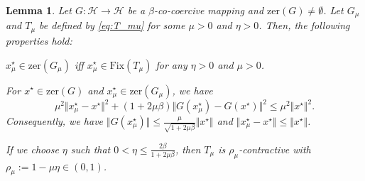 \documentclass{article}
\theoremstyle{plain}
\newtheorem{lemma}{Lemma}[section]
\theoremstyle{definition}
\newcommand{\Hil}{\mathcal{H}}
\newcommand{\norms}[1]{\Vert#1\Vert}
\newcommand{\zer}[1]{\mathrm{zer}(#1)}
\newcommand{\0}{\boldsymbol{0}}
\begin{document}
\begin{lemma}\label{le:regularized_mapping}
Let $G : \Hil \to \Hil$ be a $\beta$-co-coercive mapping and $\zer{G} \neq \emptyset$.
Let $G_{\mu}$ and $T_{\mu}$ be defined by \eqref{eq:T_mu} for some $\mu > 0$ and $\eta > 0$.
Then, the following properties hold:
\begin{compactitem}
\item[$\mathrm{(i)}$] $x^{\star}_{\mu} \in \zer{G_{\mu}}$ iff $x^{\star}_{\mu} \in \mathrm{Fix}(T_{\mu})$ for any $\eta > 0$ and $\mu > 0$.
\item[$\mathrm{(ii)}$] For $x^{\star} \in \zer{G}$ and $x^{\star}_{\mu} \in \zer{G_{\mu}}$, we have 
\begin{equation}\label{eq:G_mu_pro1}
\mu^2\norms{x^{\star}_{\mu} - x^{\star}}^2 + (1 + 2\mu\beta)\norms{G(x^{\star}_{\mu}) - G(x^{\star})}^2 \leq \mu^2\norms{x^{\star}}^2.
\end{equation}
Consequently, we have $\norms{G(x_{\mu}^{\star})} \leq \frac{\mu}{\sqrt{1+2\mu\beta}}\norms{x^{\star}}$ and $\norms{x^{\star}_{\mu} - x^{\star}} \leq \norms{x^{\star}}$.
\item[$\mathrm{(iii)}$] If we choose $\eta$ such that $0 < \eta \leq \frac{2\beta}{1 + 2\mu\beta}$, then $T_{\mu}$ is $\rho_{\mu}$-contractive with $\rho_{\mu} := 1 - \mu\eta \in (0, 1)$.
\end{compactitem}
\end{lemma}
\end{document}

